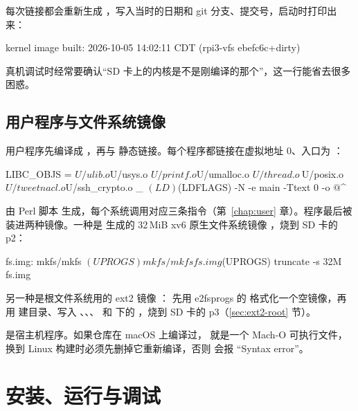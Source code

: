 每次链接都会重新生成 ，写入当时的日期和 git 分支、提交号，启动时打印出来：

\begin{txtcode}
kernel image built: 2026-10-05 14:02:11 CDT (rpi3-vfs ebefc6c+dirty)
\end{txtcode}

真机调试时经常要确认“SD 卡上的内核是不是刚编译的那个”，这一行能省去很多困惑。

\subsection{用户程序与文件系统镜像}

用户程序先编译成 ，再与  静态链接。每个程序都链接在虚拟地址 0、入口为 ：

\begin{makecode}
LIBC_OBJS = $U/ulib.o $U/usys.o $U/printf.o $U/umalloc.o $U/thread.o \
            $U/posix.o $U/tweetnacl.o $U/ssh_crypto.o
_%
	$(LD) $(LDFLAGS) -N -e main -Ttext 0 -o $@ $^
\end{makecode}

 由 Perl 脚本  生成，每个系统调用对应三条指令（第~\ref{chap:user} 章）。程序最后被装进两种镜像。一种是  生成的 32\,MiB xv6 原生文件系统镜像 ，烧到 SD 卡的 p2：

\begin{makecode}
fs.img: mkfs/mkfs $(UPROGS)
	mkfs/mkfs fs.img $(UPROGS)
	truncate -s 32M fs.img
\end{makecode}

另一种是根文件系统用的 ext2 镜像 ： 先用 e2fsprogs 的  格式化一个空镜像，再用  建目录、写入 、、、 和  下的 ，烧到 SD 卡的 p3（\ref{sec:ext2-root} 节）。

\begin{note}
   是宿主机程序。如果仓库在 macOS 上编译过， 就是一个 Mach-O 可执行文件，换到 Linux 构建时必须先删掉它重新编译，否则  会报 “Syntax error”。
\end{note}

\section{安装、运行与调试}


